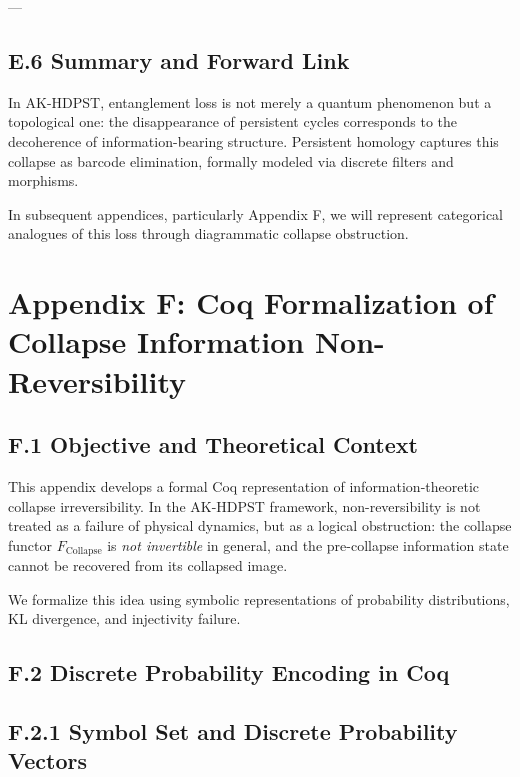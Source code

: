 \documentclass[11pt]{article}
\begin{document}
---

\subsection*{E.6 Summary and Forward Link}

In AK-HDPST, entanglement loss is not merely a quantum phenomenon but a topological one: the disappearance of persistent cycles corresponds to the decoherence of information-bearing structure. Persistent homology captures this collapse as barcode elimination, formally modeled via discrete filters and morphisms.

In subsequent appendices, particularly Appendix F, we will represent categorical analogues of this loss through diagrammatic collapse obstruction.



\section*{Appendix F: Coq Formalization of Collapse Information Non-Reversibility}

\subsection*{F.1 Objective and Theoretical Context}

This appendix develops a formal Coq representation of information-theoretic collapse irreversibility. In the AK-HDPST framework, non-reversibility is not treated as a failure of physical dynamics, but as a logical obstruction: the collapse functor \( F_{\mathrm{Collapse}} \) is \emph{not invertible} in general, and the pre-collapse information state cannot be recovered from its collapsed image.

We formalize this idea using symbolic representations of probability distributions, KL divergence, and injectivity failure.

\subsection*{F.2 Discrete Probability Encoding in Coq}

\subsection*{F.2.1 Symbol Set and Discrete Probability Vectors}
\end{document}
